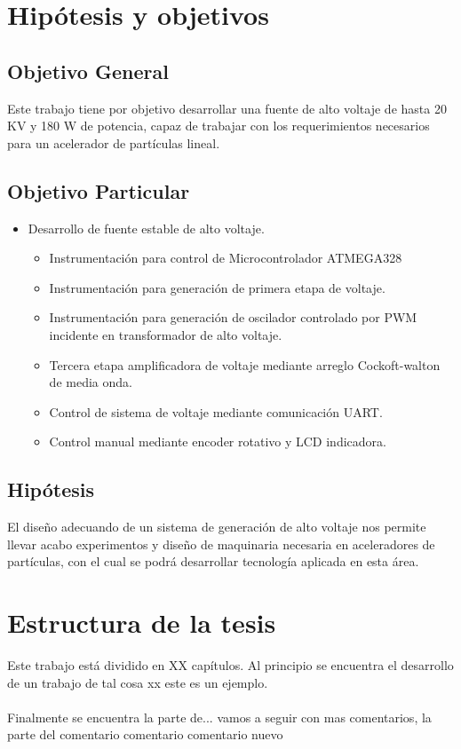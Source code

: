 \section{Hipótesis y objetivos}

\subsection{Objetivo General}

Este trabajo tiene por objetivo desarrollar una fuente de alto voltaje de hasta 20 KV y 180 W de potencia, capaz de trabajar con los requerimientos necesarios para un acelerador de partículas lineal.

\subsection{Objetivo Particular}


\begin{itemize}
\item Desarrollo de fuente estable de alto voltaje.
\begin{itemize}
\item Instrumentación para control de Microcontrolador ATMEGA328
\item Instrumentación para generación de primera etapa de voltaje.
\item Instrumentación para generación de oscilador controlado por PWM incidente en transformador de alto voltaje.
\item Tercera etapa amplificadora de voltaje mediante arreglo Cockoft-walton de media onda.
\item Control de sistema de voltaje mediante comunicación UART.
\item Control manual mediante encoder rotativo y LCD indicadora.
\
\end{itemize}  
\end{itemize}

\subsection{Hipótesis}
El diseño adecuando de un sistema de generación de alto voltaje nos permite llevar acabo experimentos y diseño de maquinaria necesaria en aceleradores de partículas, con el cual se podrá desarrollar tecnología aplicada en esta área.


\section{Estructura de la tesis}

Este trabajo está dividido en XX capítulos. Al principio se encuentra el desarrollo de un trabajo de tal cosa xx este es un ejemplo.
\\\\
Finalmente se encuentra la parte de... vamos a seguir con mas comentarios, la parte del comentario comentario comentario nuevo